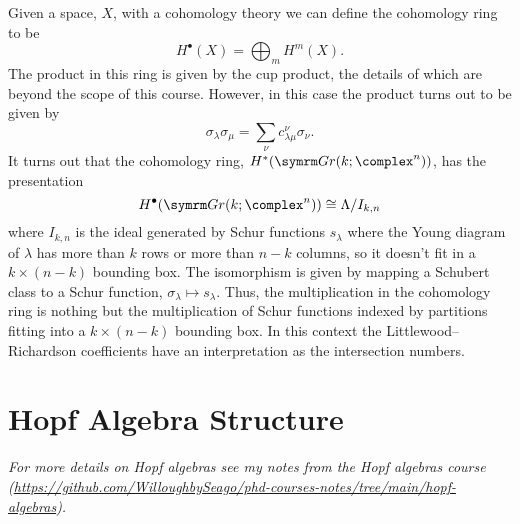 Given a space, \(X\), with a cohomology theory we can define the cohomology ring to be
\begin{equation}
    H^{\bullet}(X) = \bigoplus_m H^m(X).
\end{equation}
The product in this ring is given by the cup product, the details of which are beyond the scope of this course.
However, in this case the product turns out to be given by
\begin{equation}
    \sigma_\lambda \sigma_\mu = \sum_\nu c^{\nu}_{\lambda\mu} \sigma_\nu.
\end{equation}
It turns out that the cohomology ring, \(H^*(\Gr(k; \complex^n))\), has the presentation
\begin{equation}
    H^{\bullet}(\Gr(k; \complex^n)) \isomorphic \Lambda / I_{k,n}
\end{equation}
where \(I_{k,n}\) is the ideal generated by Schur functions \(s_\lambda\) where the Young diagram of \(\lambda\) has more than \(k\) rows or more than \(n - k\) columns, so it doesn't fit in a \(k \times (n - k)\) bounding box.
The isomorphism is given by mapping a Schubert class to a Schur function, \(\sigma_\lambda \mapsto s_\lambda\).
Thus, the multiplication in the cohomology ring is nothing but the multiplication of Schur functions indexed by partitions fitting into a \(k \times (n - k)\) bounding box.
In this context the Littlewood--Richardson coefficients have an interpretation as the intersection numbers.

\section{Hopf Algebra Structure}
\textit{For more details on Hopf algebras see my notes from the Hopf algebras course (\url{https://github.com/WilloughbySeago/phd-courses-notes/tree/main/hopf-algebras}).}

